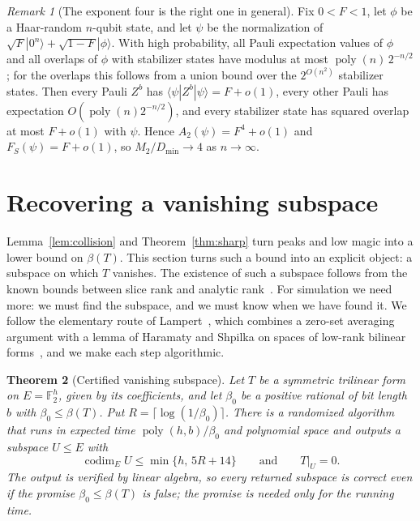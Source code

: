 \documentclass[a4paper,onecolumn,11pt,unpublished]{quantumarticle}
\theoremstyle{plain}
\newtheorem{theorem}{Theorem}
\theoremstyle{remark}
\newtheorem{remark}[theorem]{Remark}
\newcommand{\F}{\mathbb{F}_2}
\newcommand{\ket}[1]{|#1\rangle}
\newcommand{\bra}[1]{\langle #1|}
\DeclareMathOperator{\codim}{codim}
\DeclareMathOperator{\poly}{poly}
\begin{document}
\begin{remark}[The exponent four is the right one in general]\label{rem:general}
Fix $0<F<1$, let $\phi$ be a Haar-random $n$-qubit state, and let $\psi$ be the normalization of $\sqrt F\ket{0^n}+\sqrt{1-F}\ket{\phi}$. With high probability, all Pauli expectation values of $\phi$ and all overlaps of $\phi$ with stabilizer states have modulus at most $\poly(n)\,2^{-n/2}$; for the overlaps this follows from a union bound over the $2^{O(n^2)}$ stabilizer states. Then every Pauli $Z^b$ has $\bra{\psi}Z^b\ket{\psi}=F+o(1)$, every other Pauli has expectation $O(\poly(n)2^{-n/2})$, and every stabilizer state has squared overlap at most $F+o(1)$ with $\psi$. Hence $A_2(\psi)=F^4+o(1)$ and $F_S(\psi)=F+o(1)$, so $M_2/D_{\min}\to4$ as $n\to\infty$. %
\end{remark}

\section{Recovering a vanishing subspace}\label{sec:recovery}

Lemma~\ref{lem:collision} and Theorem~\ref{thm:sharp} turn peaks and low magic into a lower bound on $\beta(T)$. This section turns such a bound into an explicit object: a subspace on which $T$ vanishes. The existence of such a subspace follows from the known bounds between slice rank and analytic rank~\cite{AKZ21,CM22,Lam25,MZ26}. For simulation we need more: we must find the subspace, and we must know when we have found it. We follow the elementary route of Lampert~\cite{Lam25}, which combines a zero-set averaging argument with a lemma of Haramaty and Shpilka on spaces of low-rank bilinear forms~\cite[Lemma~3.7]{HS10}, and we make each step algorithmic.

\begin{theorem}[Certified vanishing subspace]\label{thm:recovery}
Let $T$ be a symmetric trilinear form on $E=\F^h$, given by its coefficients, and let $\beta_0$ be a positive rational of bit length $b$ with $\beta_0\le\beta(T)$. Put $R=\lceil\log(1/\beta_0)\rceil$. There is a randomized algorithm that runs in expected time $\poly(h,b)/\beta_0$ and polynomial space and outputs a subspace $U\le E$ with
\[
\codim_EU\le\min\{h,\,5R+14\}\qquad\text{and}\qquad T|_U=0 .
\]
The output is verified by linear algebra, so every returned subspace is correct even if the promise $\beta_0\le\beta(T)$ is false; the promise is needed only for the running time.
\end{theorem}
\end{document}
